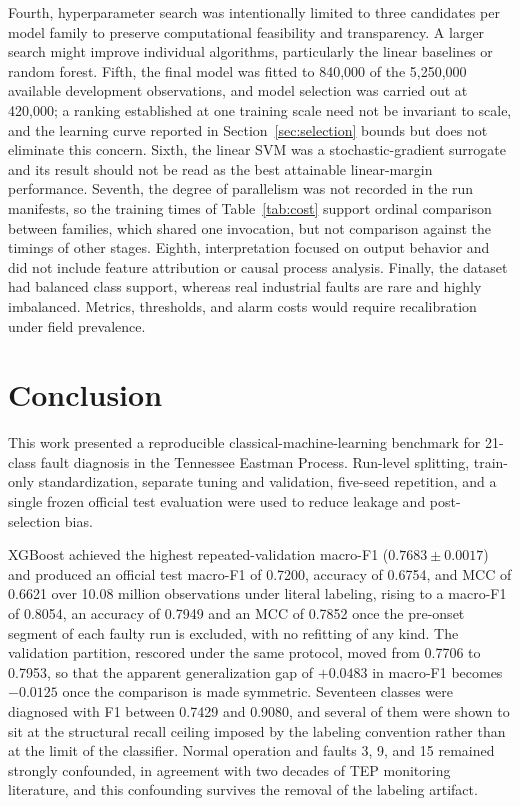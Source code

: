 \documentclass[12pt,a4paper]{article}
\begin{document}
Fourth, hyperparameter search was intentionally limited to three candidates per
model family to preserve computational feasibility and transparency. A larger
search might improve individual algorithms, particularly the linear baselines
or random forest. Fifth, the final model was fitted to 840,000 of the 5,250,000
available development observations, and model selection was carried out at
420,000; a ranking established at one training scale need not be invariant to
scale, and the learning curve reported in Section~\ref{sec:selection} bounds but
does not eliminate this concern. Sixth, the linear SVM was a stochastic-gradient
surrogate and its result should not be read as the best attainable
linear-margin performance. Seventh, the degree of parallelism was not recorded in the run manifests, so
the training times of Table~\ref{tab:cost} support ordinal comparison between
families, which shared one invocation, but not comparison against the timings
of other stages. Eighth, interpretation focused on output behavior
and did not include feature attribution or causal process analysis. Finally, the
dataset had balanced class support, whereas real industrial faults are rare and
highly imbalanced. Metrics, thresholds, and alarm costs would require
recalibration under field prevalence.

\section{Conclusion}

This work presented a reproducible classical-machine-learning benchmark for
21-class fault diagnosis in the Tennessee Eastman Process. Run-level splitting,
train-only standardization, separate tuning and validation, five-seed repetition,
and a single frozen official test evaluation were used to reduce leakage and
post-selection bias.

XGBoost achieved the highest repeated-validation macro-F1
($0.7683\pm0.0017$) and produced an official test macro-F1 of 0.7200, accuracy
of 0.6754, and MCC of 0.6621 over 10.08 million observations under literal
labeling, rising to a macro-F1 of 0.8054, an accuracy of 0.7949 and an MCC of
0.7852 once the pre-onset segment of each faulty run is excluded, with no
refitting of any kind. The validation partition, rescored under the same
protocol, moved from 0.7706 to 0.7953, so that the apparent generalization gap
of $+0.0483$ in macro-F1 becomes $-0.0125$ once the comparison is made
symmetric. Seventeen classes were diagnosed with F1 between
0.7429 and 0.9080, and several of them were shown to sit at the structural
recall ceiling imposed by the labeling convention rather than at the limit of
the classifier. Normal operation and faults 3, 9, and 15 remained strongly
confounded, in agreement with two decades of TEP monitoring literature, and
this confounding survives the removal of the labeling artifact.
\end{document}
